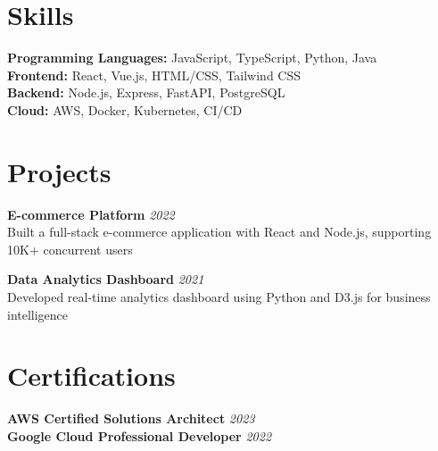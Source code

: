 \documentclass{article}
\begin{document}
\section*{Skills}
\textbf{Programming Languages:} JavaScript, TypeScript, Python, Java \\
\textbf{Frontend:} React, Vue.js, HTML/CSS, Tailwind CSS \\
\textbf{Backend:} Node.js, Express, FastAPI, PostgreSQL \\
\textbf{Cloud:} AWS, Docker, Kubernetes, CI/CD

\vspace{0.2cm}

\section*{Projects}
\textbf{E-commerce Platform} \hfill \textit{2022} \\
Built a full-stack e-commerce application with React and Node.js, supporting 10K+ concurrent users

\textbf{Data Analytics Dashboard} \hfill \textit{2021} \\
Developed real-time analytics dashboard using Python and D3.js for business intelligence

\vspace{0.2cm}

\section*{Certifications}
\textbf{AWS Certified Solutions Architect} \hfill \textit{2023} \\
\textbf{Google Cloud Professional Developer} \hfill \textit{2022}
\end{document}
